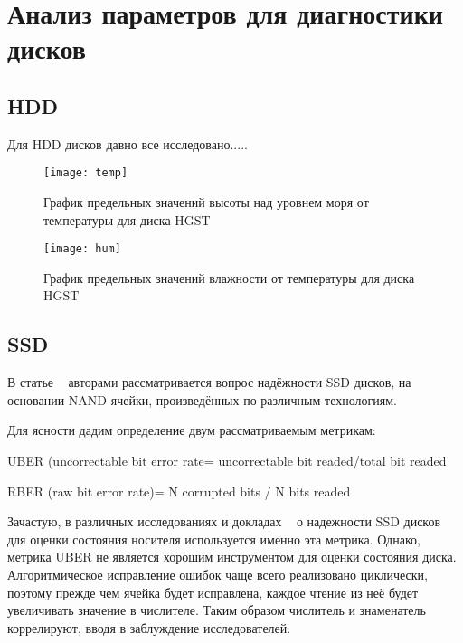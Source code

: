 \chapter{Анализ параметров для диагностики дисков}

\section{HDD}
Для HDD дисков давно все исследовано.....
\begin{figure}[h]
	\centering
	\texttt{[image: temp]}
	\caption{График предельных значений высоты над уровнем моря от температуры для диска HGST}
	\label{fig:temp}
\end{figure}
\begin{figure}[h]
	\centering
	\texttt{[image: hum]}
	\caption{График предельных значений влажности от температуры для диска HGST}
	\label{fig:hum}
\end{figure}

\section{SSD}

В статье ~\cite{reliabil} авторами рассматривается вопрос надёжности SSD дисков, на основании NAND ячейки, произведённых по различным технологиям.

Для ясности дадим определение двум рассматриваемым метрикам:
\begin{itemize*}
	\item{UBER (uncorrectable bit error rate= uncorrectable bit readed/total bit readed}
	\item{RBER (raw bit error rate)= N corrupted bits / N bits readed}
\end{itemize*}
Зачастую, в различных исследованиях и докладах ~\cite{art} о надежности SSD дисков для оценки состояния носителя используется именно эта метрика. 
Однако, метрика UBER не является хорошим инструментом для оценки состояния диска. Алгоритмическое исправление ошибок чаще всего реализовано циклически, поэтому прежде чем ячейка будет исправлена, каждое чтение из неё будет увеличивать значение в числителе. Таким образом числитель и знаменатель коррелируют, вводя в заблуждение исследователей. 

